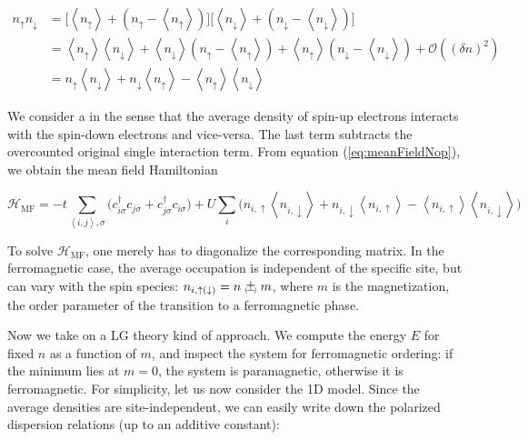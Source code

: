 \begin{equation}\label{eq:meanFieldNop}
\begin{split}
n_\uparrow n_\downarrow &= \bigg[ \left\langle n_\uparrow \right\rangle + ( n_\uparrow - \left\langle n_\uparrow \right\rangle ) \bigg] \bigg[ \left\langle n_\downarrow \right\rangle + ( n_\downarrow - \left\langle n_\downarrow \right\rangle ) \bigg] \\
&= \left\langle n_\uparrow \right\rangle \left\langle n_\downarrow \right\rangle + \left\langle n_\downarrow \right\rangle ( n_\uparrow - \left\langle n_\uparrow \right\rangle ) + \left\langle n_\uparrow \right\rangle ( n_\downarrow - \left\langle n_\downarrow \right\rangle ) + \mathcal{O}((\delta n)^2) \\
&= n_\uparrow \left\langle n_\downarrow \right\rangle + n_\downarrow \left\langle n_\uparrow \right\rangle - \left\langle n_\uparrow \right\rangle \left\langle n_\downarrow \right\rangle
\end{split}
\end{equation}

We consider a  in the sense that the average density of spin-up electrons interacts with the spin-down electrons and vice-versa.
The last term subtracts the overcounted original single interaction term.
From equation (\ref{eq:meanFieldNop}), we obtain the mean field Hamiltonian

\begin{equation}
\mathcal{H}_{\text{MF}} = - t \sum_{\left\langle i, j \right\rangle, \sigma} \bigg( c_{i\sigma}^\dagger c_{j\sigma} + c_{j\sigma}^\dagger c_{i\sigma} \bigg) + U \sum_i \bigg( n_{i,\uparrow} \left\langle n_{i, \downarrow} \right\rangle + n_{i, \downarrow} \left\langle n_{i, \uparrow} \right\rangle - \left\langle n_{i, \uparrow} \right\rangle \left\langle n_{i, \downarrow} \right\rangle \bigg)
\end{equation}

To solve $\mathcal{H}_{\text{MF}}$, one merely has to diagonalize the corresponding matrix.
In the ferromagnetic case, the average occupation is independent of the specific site, but can vary with the spin species: $n_{i, \uparrow(\downarrow)} = n \Pm m$, where $m$ is the magnetization, the order parameter of the transition to a ferromagnetic phase.

Now we take on a \acl{LG} theory kind of approach.
We compute the energy $E$ for fixed $n$ as a function of $m$, and inspect the system for ferromagnetic ordering: if the minimum lies at $m = 0$, the system is paramagnetic, otherwise it is ferromagnetic.
For simplicity, let us now consider the \acs{1D} model.
Since the average densities are site-independent, we can easily write down the polarized dispersion relations (up to an additive constant):

